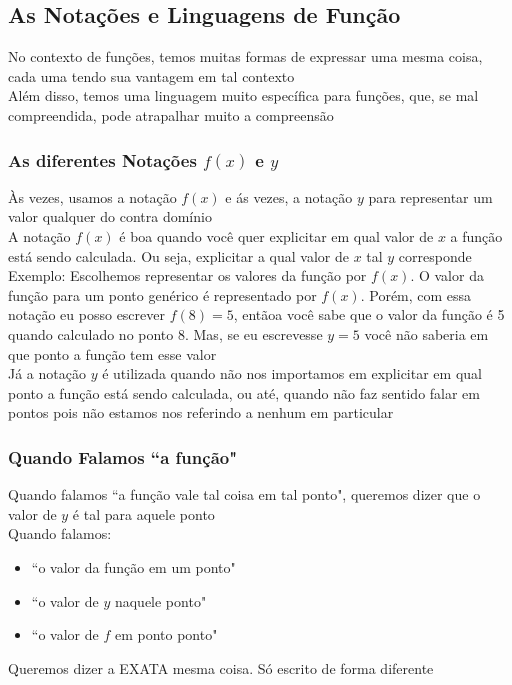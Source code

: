 \documentclass{article}
\begin{document}
\subsection{As Notações e Linguagens de Função}
No contexto de funções, temos muitas formas de expressar uma mesma coisa, cada uma tendo sua vantagem em tal contexto
\\[2pt]
Além disso, temos uma linguagem muito específica para funções, que, se mal compreendida, pode atrapalhar muito a compreensão

\subsubsection{As diferentes Notações $f(x)$ e $y$}
Às vezes, usamos a notação $f(x)$ e ás vezes, a notação $y$ para representar um valor qualquer do contra domínio
\\[5pt]
A notação $f(x)$ é boa quando você quer explicitar em qual valor de $x$ a função está sendo calculada. Ou seja, explicitar a qual valor de $x$ tal $y$ corresponde
\\[2pt]
Exemplo: Escolhemos representar os valores da função por $f(x)$. O valor da função para um ponto genérico é representado por $f(x)$. Porém, com essa notação eu posso escrever $f(8) = 5$, entãoa você sabe que o valor da função é 5 quando calculado no ponto 8. Mas, se eu escrevesse $y = 5$ você não saberia em que ponto a função tem esse valor
\\[5pt]
Já a notação $y$ é utilizada quando não nos importamos em explicitar em qual ponto a função está sendo calculada, ou até, quando não faz sentido falar em pontos pois não estamos nos referindo a nenhum em particular

\subsubsection{Quando Falamos ``a função"}
Quando falamos ``a função vale tal coisa em tal ponto", queremos dizer que o valor de $y$ é tal para aquele ponto
\\[5pt]
Quando falamos:
\begin{itemize}
    \item ``o valor da função em um ponto"

    \item ``o valor de $y$ naquele ponto"

    \item ``o valor de $f$ em ponto ponto"
\end{itemize}
Queremos dizer a EXATA mesma coisa. Só escrito de forma diferente
\end{document}
